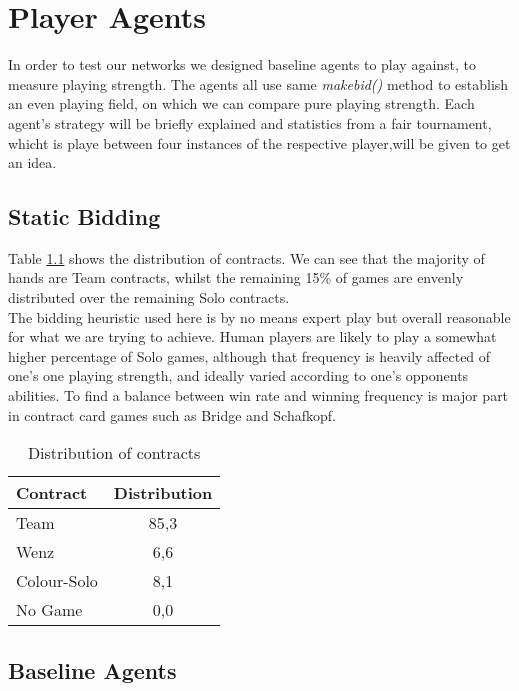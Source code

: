 \chapter{Player Agents}
In order to test our networks we designed baseline agents to play against, to measure playing strength.
The agents all use same \textit{makebid()} method to establish an even playing field, on which we can compare pure
playing strength.
Each agent's strategy will be briefly explained and statistics from a fair tournament, whicht is playe between four
instances of the respective player,will be given to get an idea.


\section{Static Bidding}
Table \ref{tab:distributionBidding} shows the distribution of contracts.
We can see that the majority of hands are Team contracts, whilst the remaining 15\% of games are envenly distributed
over the remaining Solo contracts.\\
The bidding heuristic used here is by no means expert play but overall reasonable for what we are trying to achieve.
Human players are likely to play a somewhat higher percentage of Solo games, although that frequency is heavily
affected of one's one playing strength, and ideally varied according to one's opponents abilities.
To find a balance between win rate and winning frequency is major part in contract card games such as Bridge and
Schafkopf.
\begin{table}[!h]
    \centering
    \begin{tabular}{lc}
        \toprule
        Contract    & Distribution \\
        \midrule
        Team        & 85,3         \\
        Wenz        & 6,6          \\
        Colour-Solo & 8,1          \\
        No Game     & 0,0          \\
        \bottomrule
    \end{tabular}
    \caption{Distribution of contracts}
    \label{tab:distributionBidding}
\end{table}


\section{Baseline Agents}

